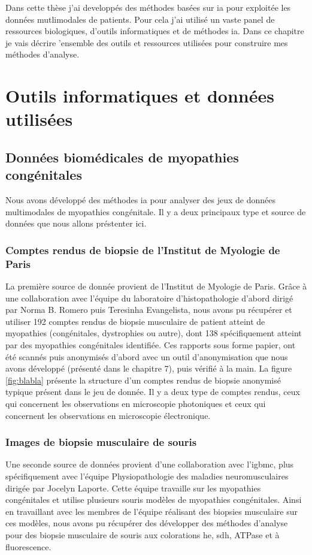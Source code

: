 Dans cette thèse j'ai developpés des méthodes basées sur \gls{ia} pour exploitée les données mutlimodales de patients. Pour cela j'ai utilisé un vaste panel de ressources biologiques, d'outils informatiques et de méthodes \gls{ia}. Dans ce chapitre je vais décrire 'ensemble des outils et ressources utilisées pour construire mes méthodes d'analyse.

\chapter{Outils informatiques et données utilisées}

\section{Données biomédicales de myopathies congénitales}
Nous avons développé des méthodes \gls{ia} pour analyser des jeux de données multimodales de myopathies congénitale. Il y a deux principaux type et source de données que nous allons préstenter ici.

\subsection{Comptes rendus de biopsie de l'Institut de Myologie de Paris}
La première source de donnée provient de l'Institut de Myologie de Paris. Grâce à une collaboration avec l'équipe du laboratoire d’histopathologie d'abord dirigé par Norma B. Romero puis Teresinha Evangelista, nous avons pu récupérer et utiliser 192 comptes rendus de biopsie musculaire de patient atteint de myopathies (congénitales, dystrophies ou autre), dont 138 spécifiquement atteint par des myopathies congénitales identifiée. Ces rapports sous forme papier, ont été scannés puis anonymisés d'abord avec un outil d'anonymisation que nous avons développé (présenté dans le chapitre 7), puis vérifié à la main. La figure \ref{fig:blabla} présente la structure d'un comptes rendus de biopsie anonymisé typique présent dans le jeu de donnée. Il y a deux type de comptes rendus, ceux qui concernent les observations en microscopie photoniques et ceux qui concernent les observations en microscopie électronique.

\subsection{Images de biopsie musculaire de souris}
Une seconde source de données provient d'une collaboration avec l'\gls{igbmc}, plus spécifiquement avec l'équipe Physiopathologie des maladies neuromusculaires dirigée par Jocelyn Laporte. Cette équipe travaille sur les myopathies congénitales et utilise plusieurs souris modèles de myopathies congénitales. Ainsi en travaillant avec les membres de l'équipe réalisant des biopsies musculaire sur ces modèles, nous avons pu récupérer des développer des méthodes d'analyse pour des biopsie musculaire de souris aux colorations \gls{he}, \gls{sdh}, ATPase et à fluorescence.

